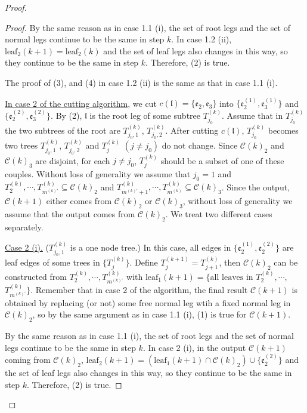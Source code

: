 \begin{proof}
\begin{proof}
By the same reason as in case 1.1 (i), the set of root legs and the set of normal legs continue to be the same in step $k$. In case 1.2 (ii), $\text{leaf}_2(k+1)=\text{leaf}_2(k)$ and the set of leaf legs also changes in this way, so they continue to be the same in step $k$. Therefore, (2) is true.

The proof of (3), and (4) in case 1.2 (ii) is the same as that in case 1.1 (i).

\underline{In case 2 of the cutting algorithm}, we cut $c(\mathfrak{l})=\{\mathfrak{e}_2,\mathfrak{e}_3\}$ into $\{\mathfrak{e}_{2}^{(1)}, \mathfrak{e}_{3}^{(1)}\}$ and $\{\mathfrak{e}_{2}^{(2)}, \mathfrak{e}_{3}^{(2)}\}$. By (2), $\mathfrak{l}$ is the root leg of some subtree $T^{(k)}_{j_0}$. Assume that in $T^{(k)}_{j_0}$ the two subtrees of the root are $T^{(k)}_{j_0,1}$, $T^{(k)}_{j_0,2}$. After cutting $c(\mathfrak{l})$, $T^{(k)}_{j_0}$ becomes two trees $T^{(k)}_{j_0,1}$, $T^{(k)}_{j_0,2}$ and $T^{(k)}_{j}$ $(j\ne j_0)$ do not change. Since $\mathcal{C}(k)_{2}$ and $\mathcal{C}(k)_{3}$ are disjoint, for each $j\ne j_0$, $T^{(k)}_{j}$ should be a subset of one of these couples. Without loss of generality we assume that $j_0=1$ and $T^{(k)}_2, \cdots, T^{(k)}_{m^{(k)'}}\subseteq \mathcal{C}(k)_{2}$ and $T^{(k)}_{m^{(k)'}+1}, \cdots, T^{(k)}_{m^{(k)}}\subseteq \mathcal{C}(k)_{3}$. Since the output, $\mathcal{C}(k+1)$ either comes from $\mathcal{C}(k)_{2}$ or $\mathcal{C}(k)_{3}$, without loss of generality we assume that the output comes from $\mathcal{C}(k)_{2}$. We treat two different cases separately.

\underline{Case 2 (i).} ($T^{(k)}_{j_0,1}$ is a one node tree.) In this case, all edges in $\{\mathfrak{e}_{2}^{(1)}, \mathfrak{e}_{2}^{(2)}\}$ are leaf edges of some trees in $\{T_{j}^{(k)}\}$. Define $T^{(k+1)}_{j}=T^{(k)}_{j+1}$, then $\mathcal{C}(k)_2$ can be constructed from $T^{(k)}_2, \cdots, T^{(k)}_{m^{(k)'}}$ with $\text{leaf}_1(k+1)=\{\text{all leaves in }T^{(k)}_2, \cdots,$ $T^{(k)}_{m^{(k)'}}\}$. Remember that in case 2 of the algorithm, the final result $\mathcal{C}(k+1)$ is obtained by replacing (or not) some free normal leg wtih a fixed normal leg in $\mathcal{C}(k)_2$, so by the same argument as in case 1.1 (i), (1) is true for $\mathcal{C}(k+1)$.

By the same reason as in case 1.1 (i), the set of root legs and the set of normal legs continue to be the same in step $k$. In case 2 (i), in the output $\mathcal{C}(k+1)$ coming from $\mathcal{C}(k)_2$, $\text{leaf}_2(k+1)=(\text{leaf}_1(k+1)\cap \mathcal{C}(k)_2)\cup \{ \mathfrak{e}_{2}^{(2)}\}$ and the set of leaf legs also changes in this way, so they continue to be the same in step $k$. Therefore, (2) is true.


\end{proof}
\end{proof}
